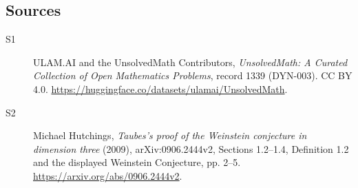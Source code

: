 \documentclass[11pt]{article}
\begin{document}
\subsection{Sources}
\begin{description}
\item[\hypertarget{source:1339:1}{S1}] ULAM.AI and the UnsolvedMath Contributors, \emph{UnsolvedMath: A Curated Collection of Open Mathematics Problems}, record 1339 (DYN-003). CC BY 4.0. \url{https://huggingface.co/datasets/ulamai/UnsolvedMath}.
\item[\hypertarget{source:1339:2}{S2}] Michael Hutchings, \emph{Taubes's proof of the Weinstein conjecture in dimension three} (2009), arXiv:0906.2444v2, Sections 1.2--1.4, Definition 1.2 and the displayed Weinstein Conjecture, pp. 2--5. \url{https://arxiv.org/abs/0906.2444v2}.
\end{description}
\label{end:1339}
\end{document}
